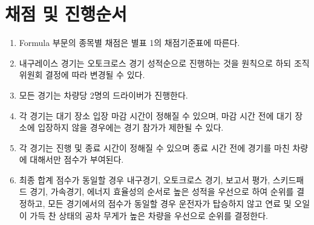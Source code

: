 \documentclass[final,a4paper,10pt]{report}
\begin{document}
{\section{채점 및 진행순서}\label{rule:formula-competition.scoring-and-order}
\begin{enumerate}
  \item\label{rule:formula-competition.scoring-and-order.per-event-scoring-table} Formula 부문의 종목별 채점은 별표 1의 채점기준표에 따른다.
  \item\label{rule:formula-competition.scoring-and-order.endurance-order-follows-autocross} 내구레이스 경기는 오토크로스 경기 성적순으로 진행하는 것을 원칙으로 하되 조직위원회 결정에 따라 변경될 수 있다.
  \item\label{rule:formula-competition.scoring-and-order.two-drivers-per-car} 모든 경기는 차량당 2명의 드라이버가 진행한다.
  \item\label{rule:formula-competition.scoring-and-order.staging-area-entry-deadline} 각 경기는 대기 장소 입장 마감 시간이 정해질 수 있으며, 마감 시간 전에 대기 장소에 입장하지 않을 경우에는 경기 참가가 제한될 수 있다.
  \item\label{rule:formula-competition.scoring-and-order.scoring-cutoff-time} 각 경기는 진행 및 종료 시간이 정해질 수 있으며 종료 시간 전에 경기를 마친 차량에 대해서만 점수가 부여된다.
  \item\label{rule:formula-competition.scoring-and-order.tiebreak-criteria} 최종 합계 점수가 동일할 경우 내구경기, 오토크로스 경기, 보고서 평가, 스키드패드 경기, 가속경기, 에너지 효율성의 순서로 높은 성적을 우선으로 하여 순위를 결정하고, 모든 경기에서의 점수가 동일할 경우 운전자가 탑승하지 않고 연료 및 오일이 가득 찬 상태의 공차 무게가 높은 차량을 우선으로 순위를 결정한다.
\end{enumerate}

}
\end{document}
